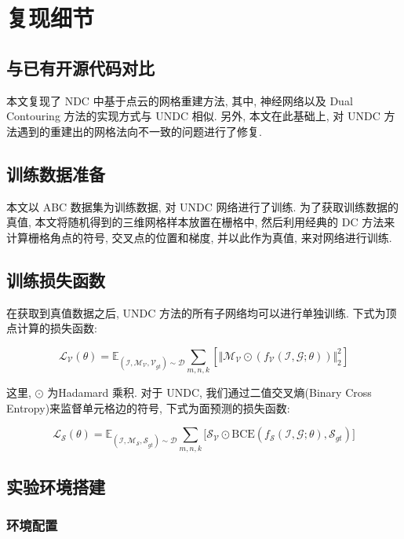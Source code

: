 \section{复现细节}

\subsection{与已有开源代码对比}

本文复现了 NDC 中基于点云的网格重建方法, 其中, 神经网络以及 Dual Contouring 方法的实现方式与 UNDC 相似. 
另外, 本文在此基础上, 对 UNDC 方法遇到的重建出的网格法向不一致的问题进行了修复. 

\subsection{训练数据准备}
本文以 ABC 数据集为训练数据, 对 UNDC 网络进行了训练. 
为了获取训练数据的真值, 本文将随机得到的三维网格样本放置在栅格中, 然后利用经典的 DC 方法来计算栅格角点的符号, 交叉点的位置和梯度, 并以此作为真值, 来对网络进行训练. 

\subsection{训练损失函数}

在获取到真值数据之后, UNDC 方法的所有子网络均可以进行单独训练. 
下式为顶点计算的损失函数: 

\begin{equation}
    \mathcal{L_V}(\theta)=\mathbb{E}_{(\mathcal{I, M_V, V}_{gt})\sim \mathcal{D}}\sum _{m,n,k} [ \Vert \mathcal{M_V} \odot (f_{\mathcal{V}}(\mathcal{I,G};\theta)) \Vert ^2_2 ]
\end{equation}

这里, $\odot$ 为Hadamard 乘积. 对于 UNDC, 我们通过二值交叉熵(Binary Cross Entropy)来监督单元格边的符号, 下式为面预测的损失函数:

\begin{equation}
    \mathcal{L_S}(\theta)=\mathbb{E}_{(\mathcal{I, M_S, S}_{gt})\sim \mathcal{D}}\sum_{m,n,k} \lbrack \mathcal{S_V} \odot \mathrm{BCE}(f_\mathcal{S}(\mathcal{I,G};\theta), \mathcal{S}_{gt}) \rbrack
\end{equation}

\subsection{实验环境搭建}

\subsubsection{环境配置}

